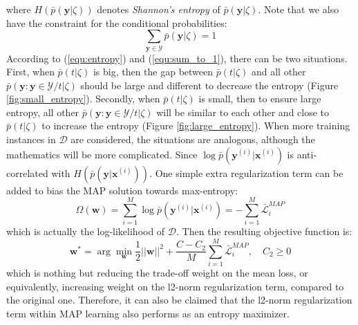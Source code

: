 where $H(\bar p(\mathbf{y}|\zeta))$ denotes \emph{Shannon's entropy} of $\bar p(\mathbf{y}|\zeta)$. Note that we also have the constraint for the conditional probabilities:   
\begin{equation}
    \sum_{\mathbf{y}\in{\mathcal{Y}}} \bar p(\mathbf{y}|\zeta)=1
    \label{equ:sum_to_1}
\end{equation}
According to (\ref{equ:entropy}) and (\ref{equ:sum_to_1}), there can be two situations. First, when $\bar p(t|\zeta)$ is big, then the gap between $\bar p(t|\zeta)$ and all other  
$\bar p(\mathbf{y}:\mathbf{y}\in\mathcal{Y}/t|\zeta)$ should be large and different to decrease the entropy (Figure \ref{fig:small_entropy}). Secondly, when $\bar p(t|\zeta)$ is small,       
then to ensure large entropy, all other $\bar p(\mathbf{y}:\mathbf{y}\in\mathcal{Y}/t|\zeta)$ will be similar to each other and close to $\bar p(t|\zeta)$ to increase the 
entropy (Figure \ref{fig:large_entropy}).  
When more training instances in $\mathcal{D}$ are considered, the situations are analogous, although the mathematics will be more complicated.    
Since $\log \bar p(\mathbf{y}^{(i)}|\mathbf{x}^{(i)})$  
is anti-correlated with $H(\bar p(\mathbf{y}|\mathbf{x}^{(i)}))$.  One simple extra regularization term can be added to bias the MAP solution towards max-entropy:    
\begin{equation}
    \Omega(\mathbf{w})=\sum_{i=1}^M\log \bar p(\mathbf{y}^{(i)}|\mathbf{x}^{(i)})=-\sum_{i=1}^M \bar{\mathcal{L}}^{MAP}_i
\end{equation}
which is actually the log-likelihood of $\mathcal{D}$. Then the resulting objective function is: 
\begin{equation}  
    \mathbf{w}^* =\arg\min_{\mathbf{w}} \frac{1}{2} ||\mathbf{w}||^2+  \frac{C-C_2}{M}\sum_{i=1}^M \bar{\mathcal{L}}^{MAP}_i, \quad C_2\geq0
       \label{equ:MEnMAP}
\end{equation}
which is nothing but reducing the trade-off weight on the mean loss, or equivalently, increasing weight on the l2-norm regularization term, compared to the 
original one.    
Therefore, it can also be claimed that the l2-norm regularization term within MAP learning also performs as an entropy maximizer.  

